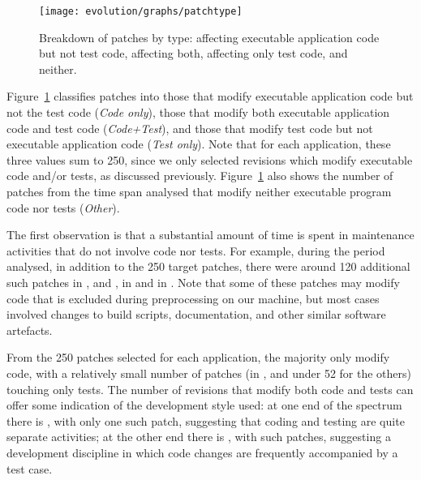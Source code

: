 \begin{figure}[t]
\centering
\texttt{[image: evolution/graphs/patchtype]}
\caption{Breakdown of patches by type: affecting executable application code but not test code, affecting both, affecting only test code, and neither.}
\label{fig:patch-types}
\end{figure}

Figure~\ref{fig:patch-types} classifies patches into those that modify
executable application code but not the test code (\textit{Code
only}), those that modify both executable application code and test
code (\textit{Code+Test}), and those that modify test code but not
executable application code (\textit{Test only}).  Note that for each
application, these three values sum to 250, since we only selected
revisions which modify executable code and/or tests, as discussed
previously.  Figure~\ref{fig:patch-types} also shows the number of
patches from the time span analysed that modify neither executable
program code nor tests (\textit{Other}).

The first observation is that a substantial amount of time is spent in
maintenance activities that do not involve code nor tests.  For example, during
the period analysed, in addition to the 250 target patches, there were around
120 additional such patches in \binutils, \memcached and \zeromq,
\beanstalkdNoTestNoExecutableRevs in \beanstalkd and \gitNoTestNoExecutableRevs
in \git. Note that some of these patches may modify code that is excluded
during preprocessing on our machine, but most cases involved changes to build
scripts, documentation, and other similar software artefacts.

From the 250 patches selected for each application, the majority only
modify code, with a relatively small number of patches
(\gitOnlyTestRevs in \git, and under 52 for the others) touching only
tests. The number of revisions that modify both code and tests can
offer some indication of the development style used: at one end of the
spectrum there is \redis, with only one such patch, suggesting that
coding and testing are quite separate activities; at the other end
there is \git, with \gitTestAndExecutableRevs such patches, suggesting a
development discipline in which code changes are frequently
accompanied by a test case. %



\begin{question}
  \rqthree
\end{question}

